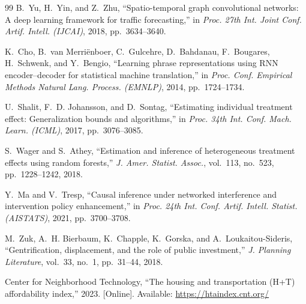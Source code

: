 \documentclass[journal]{IEEEtran}
\begin{document}
\begin{thebibliography}{99}
B.~Yu, H.~Yin, and Z.~Zhu, ``Spatio-temporal graph convolutional networks: A
deep learning framework for traffic forecasting,'' in \emph{Proc. 27th Int.
Joint Conf. Artif. Intell. (IJCAI)}, 2018, pp.~3634--3640.

K.~Cho, B.~van Merri\"{e}nboer, C.~Gulcehre, D.~Bahdanau, F.~Bougares,
H.~Schwenk, and Y.~Bengio, ``Learning phrase representations using RNN
encoder--decoder for statistical machine translation,'' in \emph{Proc. Conf.
Empirical Methods Natural Lang. Process. (EMNLP)}, 2014, pp.~1724--1734.

U.~Shalit, F.~D. Johansson, and D.~Sontag, ``Estimating individual treatment
effect: Generalization bounds and algorithms,'' in \emph{Proc. 34th Int. Conf.
Mach. Learn. (ICML)}, 2017, pp.~3076--3085.

S.~Wager and S.~Athey, ``Estimation and inference of heterogeneous treatment
effects using random forests,'' \emph{J. Amer. Statist. Assoc.}, vol.~113,
no.~523, pp.~1228--1242, 2018.

Y.~Ma and V.~Tresp, ``Causal inference under networked interference and
intervention policy enhancement,'' in \emph{Proc. 24th Int. Conf. Artif. Intell.
Statist. (AISTATS)}, 2021, pp.~3700--3708.

M.~Zuk, A.~H. Bierbaum, K.~Chapple, K.~Gorska, and A.~Loukaitou-Sideris,
``Gentrification, displacement, and the role of public investment,'' \emph{J.
Planning Literature}, vol.~33, no.~1, pp.~31--44, 2018.

Center for Neighborhood Technology, ``The housing and transportation (H+T)
affordability index,'' 2023. [Online]. Available:
\url{https://htaindex.cnt.org/}

\end{thebibliography}
\end{document}
